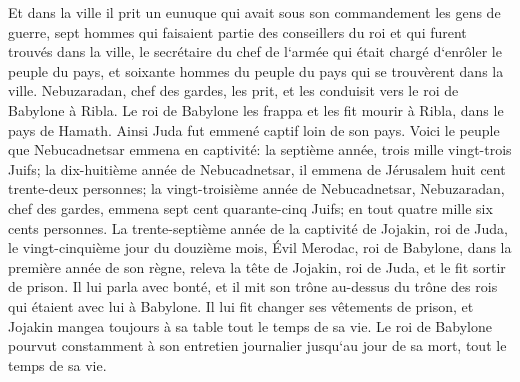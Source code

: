\verse Et dans la ville il prit un eunuque qui avait sous son commandement les gens de guerre, sept hommes qui faisaient partie des conseillers du roi et qui furent trouvés dans la ville, le secrétaire du chef de l`armée qui était chargé d`enrôler le peuple du pays, et soixante hommes du peuple du pays qui se trouvèrent dans la ville. 
\verse Nebuzaradan, chef des gardes, les prit, et les conduisit vers le roi de Babylone à Ribla. 
\verse Le roi de Babylone les frappa et les fit mourir à Ribla, dans le pays de Hamath. Ainsi Juda fut emmené captif loin de son pays. 
\verse Voici le peuple que Nebucadnetsar emmena en captivité: la septième année, trois mille vingt-trois Juifs; 
\verse la dix-huitième année de Nebucadnetsar, il emmena de Jérusalem huit cent trente-deux personnes; 
\verse la vingt-troisième année de Nebucadnetsar, Nebuzaradan, chef des gardes, emmena sept cent quarante-cinq Juifs; en tout quatre mille six cents personnes. 
\verse La trente-septième année de la captivité de Jojakin, roi de Juda, le vingt-cinquième jour du douzième mois, Évil Merodac, roi de Babylone, dans la première année de son règne, releva la tête de Jojakin, roi de Juda, et le fit sortir de prison. 
\verse Il lui parla avec bonté, et il mit son trône au-dessus du trône des rois qui étaient avec lui à Babylone. 
\verse Il lui fit changer ses vêtements de prison, et Jojakin mangea toujours à sa table tout le temps de sa vie. 
\verse Le roi de Babylone pourvut constamment à son entretien journalier jusqu`au jour de sa mort, tout le temps de sa vie. 
